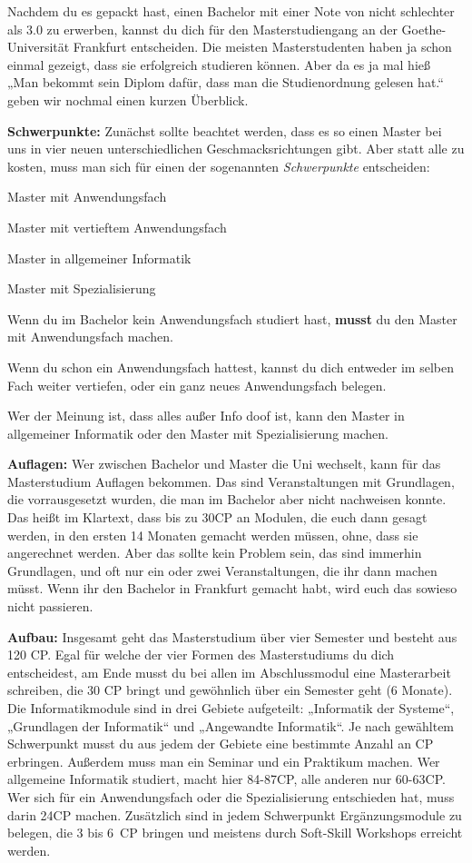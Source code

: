 \spaltenanfang
Nachdem du es gepackt hast, einen Bachelor mit einer Note von nicht schlechter als 3.0 zu erwerben, kannst du dich für den Masterstudiengang an der Goethe-Universität Frankfurt entscheiden.
Die meisten Masterstudenten haben ja schon einmal gezeigt, dass sie
erfolgreich studieren k\"onnen. Aber da es ja mal hie{\ss} „Man bekommt sein Diplom
daf\"ur, dass man die Studienordnung gelesen hat.“ geben wir nochmal einen
kurzen \"Uberblick.

\textbf{Schwerpunkte:}
Zun\"achst sollte beachtet werden, dass es so einen Master bei uns in vier neuen unterschiedlichen Geschmacksrichtungen gibt. Aber statt alle zu kosten, muss man sich f\"ur einen der sogenannten \emph{Schwerpunkte} entscheiden:
\begin{noindEnumerate}
\item Master mit Anwendungsfach
\item Master mit vertieftem Anwendungsfach
\item Master in allgemeiner Informatik
\item Master mit Spezialisierung
\end{noindEnumerate}

Wenn du im Bachelor kein Anwendungsfach studiert hast, \textbf{musst} du den Master mit Anwendungsfach machen.

Wenn du schon ein Anwendungsfach hattest, kannst du dich entweder im selben Fach weiter vertiefen, oder ein ganz neues Anwendungsfach belegen.

Wer der Meinung ist, dass alles au{\ss}er Info doof ist, kann den Master in allgemeiner Informatik oder den Master mit Spezialisierung machen. 

\textbf{Auflagen:}
Wer zwischen Bachelor und Master die Uni wechselt, kann f\"ur das Masterstudium Auflagen bekommen.
Das sind Veranstaltungen mit Grundlagen, die vorrausgesetzt wurden, die man im Bachelor aber nicht nachweisen konnte.
Das hei{\ss}t im Klartext, dass bis zu 30CP an Modulen, die euch dann gesagt werden, in den ersten 14 Monaten gemacht werden m\"ussen, ohne, dass sie angerechnet werden. Aber das sollte kein Problem sein, das sind immerhin Grundlagen, und oft nur ein oder zwei Veranstaltungen, die ihr dann machen m\"usst. Wenn ihr den Bachelor in Frankfurt gemacht habt, wird euch das sowieso nicht passieren.

\textbf{Aufbau:}
Insgesamt geht das Masterstudium über vier Semester und besteht aus 120 CP.
Egal für welche der vier Formen des Masterstudiums du dich entscheidest, am Ende musst du bei allen im Abschlussmodul eine Masterarbeit schreiben, die 30 CP bringt und gewöhnlich über ein Semester geht (6 Monate).
Die Informatikmodule sind in drei Gebiete aufgeteilt: „Informatik der Systeme“, „Grundlagen der Informatik“ und „Angewandte Informatik“. Je nach gewähltem Schwerpunkt musst du aus jedem der Gebiete eine bestimmte Anzahl an CP erbringen. Au{\ss}erdem muss man ein Seminar und ein Praktikum machen. Wer allgemeine Informatik studiert, macht hier 84-87CP, alle anderen nur 60-63CP.
Wer sich f\"ur ein Anwendungsfach oder die Spezialisierung entschieden hat, muss darin 24CP machen.
Zusätzlich sind in jedem Schwerpunkt Ergänzungsmodule zu belegen, die 3 bis 6~CP bringen und meistens durch Soft-Skill Workshops erreicht werden.

